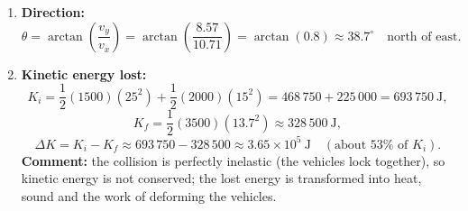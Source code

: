 \documentclass[11pt]{article}
\begin{document}
\begin{corrige}
\begin{enumerate}
\item \textbf{Direction:}
\[ \theta = \arctan\!\left(\frac{v_y}{v_x}\right) = \arctan\!\left(\frac{8.57}{10.71}\right) = \arctan(0.8) \approx 38.7^\circ \quad \text{north of east}. \]

\item \textbf{Kinetic energy lost:}
\[ K_i = \frac{1}{2}(1500)(25^2) + \frac{1}{2}(2000)(15^2) = 468\,750 + 225\,000 = 693\,750\ \mathrm{J}, \]
\[ K_f = \frac{1}{2}(3500)(13.7^2) \approx 328\,500\ \mathrm{J}, \]
\[ \Delta K = K_i - K_f \approx 693\,750 - 328\,500 \approx 3.65\times10^5\ \mathrm{J} \quad (\text{about } 53\% \text{ of } K_i). \]
\textbf{Comment:} the collision is perfectly inelastic (the vehicles lock together), so kinetic energy is not conserved; the lost energy is transformed into heat, sound and the work of deforming the vehicles.
\end{enumerate}
\end{corrige}
\end{document}
